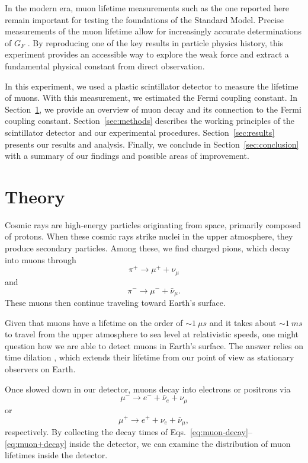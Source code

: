 \documentclass{../paper}
\begin{document}
In the modern era, muon lifetime measurements such as the one reported here remain important for testing the foundations of the Standard Model. Precise measurements of the muon lifetime allow for increasingly accurate determinations of $G_F$ \cite{Chitwood2007}. By reproducing one of the key results in particle physics history, this experiment provides an accessible way to explore the weak force and extract a fundamental physical constant from direct observation.

In this experiment, we used a plastic scintillator detector to measure the lifetime of muons. With this measurement, we estimated the Fermi coupling constant. In Section~\ref{sec:theory}, we provide an overview of muon decay and its connection to the Fermi coupling constant. Section~\ref{sec:methods} describes the working principles of the scintillator detector and our experimental procedures. Section~\ref{sec:results} presents our results and analysis. Finally, we conclude in Section~\ref{sec:conclusion} with a summary of our findings and possible areas of improvement.

\section{Theory} \label{sec:theory}

Cosmic rays are high-energy particles originating from space, primarily composed of protons. When these cosmic rays strike nuclei in the upper atmosphere, they produce secondary particles. Among these, we find charged pions, which decay into muons through
\begin{equation}
  \pi^+ \to \mu^+ + \nu_\mu
\end{equation}
and
\begin{equation}
  \pi^- \to \mu^- + \bar\nu_\mu.
\end{equation}
These muons then continue traveling toward Earth's surface.

Given that muons have a lifetime on the order of $\sim 1 \ \mu s$ and it takes about $\sim 1 \ ms$ to travel from the upper atmosphere to sea level at relativistic speeds, one might question how we are able to detect muons in Earth's surface. The answer relies on time dilation \cite{TeachSpinManual}, which extends their lifetime from our point of view as stationary observers on Earth.

Once slowed down in our detector, muons decay into electrons or positrons via
\begin{equation}\label{eq:muon-decay}
  \mu^- \to e^- + \bar\nu_e + \nu_\mu
\end{equation}
or
\begin{equation}\label{eq:muon+decay}
  \mu^+ \to e^+ + \nu_e + \bar\nu_\mu,
\end{equation}
respectively. By collecting the decay times of Eqs.~\eqref{eq:muon-decay}--\eqref{eq:muon+decay} inside the detector, we can examine the distribution of muon lifetimes inside the detector.
\end{document}
